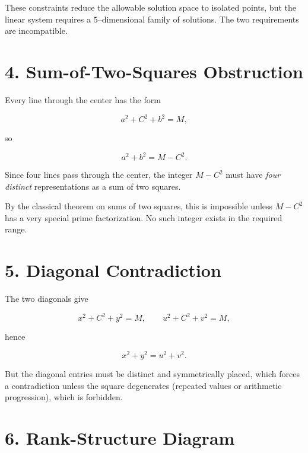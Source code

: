 \documentclass[12pt]{article}
\begin{document}
These constraints reduce the allowable solution space to isolated points,
but the linear system requires a $5$--dimensional family of solutions.
The two requirements are incompatible.

\section*{4. Sum-of-Two-Squares Obstruction}

Every line through the center has the form


\[
a^2 + C^2 + b^2 = M,
\]


so


\[
a^2 + b^2 = M - C^2.
\]



Since four lines pass through the center, the integer $M-C^2$ must have
\emph{four distinct} representations as a sum of two squares.

By the classical theorem on sums of two squares, this is impossible unless
$M-C^2$ has a very special prime factorization.  
No such integer exists in the required range.

\section*{5. Diagonal Contradiction}

The two diagonals give


\[
x^2 + C^2 + y^2 = M,\qquad
u^2 + C^2 + v^2 = M,
\]


hence


\[
x^2+y^2 = u^2+v^2.
\]



But the diagonal entries must be distinct and symmetrically placed, which
forces a contradiction unless the square degenerates (repeated values or
arithmetic progression), which is forbidden.

\section*{6. Rank-Structure Diagram}
\end{document}
